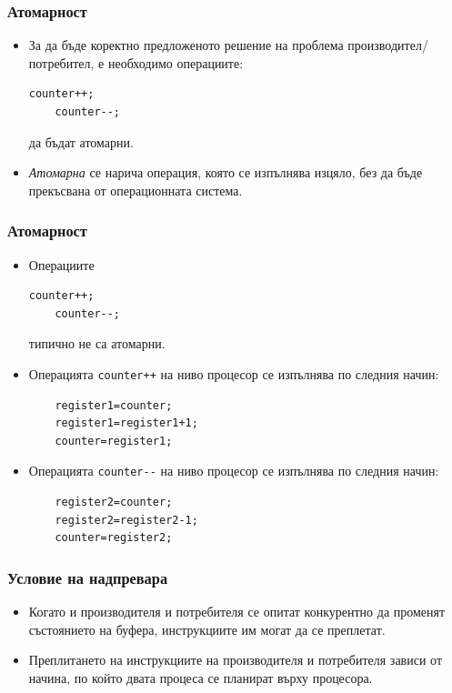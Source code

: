 \documentclass[ignorenonframetext, hyperref=unicode]{beamer}
\begin{document}
\begin{frame}[containsverbatim]
\frametitle{Атомарност}
\begin{itemize}
  \item За да бъде коректно предложеното решение на проблема
  производител/потребител, е необходимо операциите:
  \begin{lstlisting}[numbers=none]
	counter++;
	counter--;
  \end{lstlisting}
  да бъдат атомарни.
  \item {\em Атомарна} се нарича операция, която се изпълнява изцяло, без да бъде
  прекъсвана от операционната система.
\end{itemize}
\end{frame}

\begin{frame}[containsverbatim]
\frametitle{Атомарност}
\begin{itemize}
  \item Операциите
  \begin{lstlisting}[numbers=none]
	counter++;
	counter--;
  \end{lstlisting}
  типично не са атомарни.
  \item Операцията \lstinline{counter++} на ниво процесор се изпълнява
  по следния начин:
\begin{lstlisting}
	register1=counter;
	register1=register1+1;
	counter=register1;
\end{lstlisting}
  \item Операцията \lstinline{counter--} на ниво процесор се изпълнява
  по следния начин:
\begin{lstlisting}
	register2=counter;
	register2=register2-1;
	counter=register2;
\end{lstlisting}
\end{itemize}
\end{frame}

\begin{frame}[containsverbatim]
\frametitle{Условие на надпревара}
\begin{itemize}
  \item Когато и производителя и потребителя се опитат конкурентно да променят
  състоянието на буфера, инструкциите им могат да се преплетат.
  \item Преплитането на инструкциите на производителя и потребителя зависи от
  начина, по който двата процеса се планират върху процесора.
\end{itemize}
\end{frame}
\end{document}
